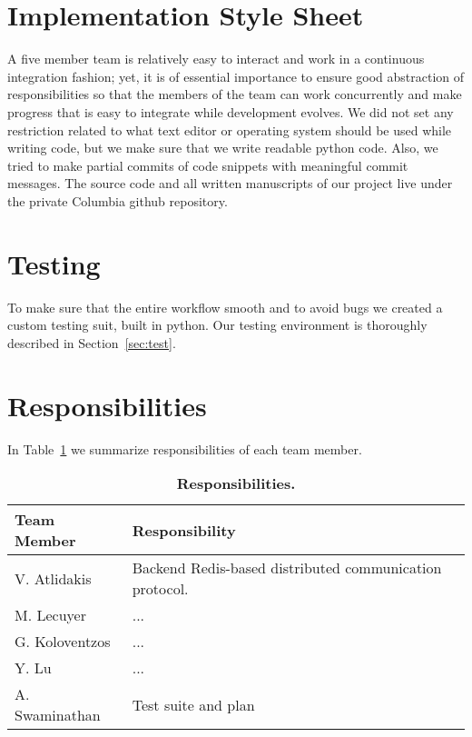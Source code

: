 \section{Implementation Style Sheet}
A five member team is relatively easy to interact and work in a continuous
integration fashion; yet, it is of essential importance to ensure good
abstraction of responsibilities so that the members of the team can work
concurrently and make progress that is easy to integrate while development
evolves. We did not set any restriction related to what text editor or
operating system  should be used while writing code, but we make sure that
we write readable python code. Also, we tried to make partial commits of
code snippets with meaningful commit messages. The source code and all written
manuscripts of our project live under the private Columbia github repository.

\section{Testing}
To make sure that the entire workflow smooth and to avoid bugs we created a
custom testing suit, built in python. Our testing environment is thoroughly
described in Section~\ref{sec:test}.

\section{Responsibilities}
In Table~\ref{tab:resp} we summarize responsibilities of each team member.
\begin{table}[!h]
{%
 \begin{center}
    \begin{tabular}{ | l || l |}
    \hline
    \textbf{Team Member} & \textbf{Responsibility} \\
    \hline
    \hline
    V. Atlidakis & Backend Redis-based distributed communication protocol.\\ \hline
    M. Lecuyer & ... \\ \hline
    G. Koloventzos & ... \\ \hline
    Y. Lu & ...  \\ \hline
    A. Swaminathan  & Test suite and plan \\ \hline
    \hline
    \end{tabular}
    \caption{\textbf{Responsibilities.}}
    \label{tab:resp}
 \end{center}
}
\end{table}

